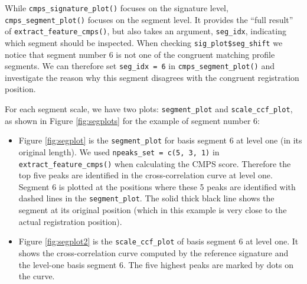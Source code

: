 While \texttt{cmps\_signature\_plot()} focuses on the signature level,
\texttt{cmps\_segment\_plot()} focuses on the segment level. It provides
the ``full result'' of \texttt{extract\_feature\_cmps()}, but also takes
an argument, \texttt{seg\_idx}, indicating which segment should be
inspected. When checking \texttt{sig\_plot\$seg\_shift} we notice that
segment number 6 is not one of the congruent matching profile segments.
We can therefore set \texttt{seg\_idx\ =\ 6} in
\texttt{cmps\_segment\_plot()} and investigate the reason why this
segment disagrees with the congruent registration position.

For each segment scale, we have two plots: \texttt{segment\_plot} and
\texttt{scale\_ccf\_plot}, as shown in Figure \ref{fig:segplots} for the
example of segment number 6:

\begin{itemize}
\item
  Figure \ref{fig:segplot} is the \texttt{segment\_plot} for basis
  segment 6 at level one (in its original length). We used
  \texttt{npeaks\_set\ =\ c(5,\ 3,\ 1)} in
  \texttt{extract\_feature\_cmps()} when calculating the CMPS score.
  Therefore the top five peaks are identified in the cross-correlation
  curve at level one. Segment 6 is plotted at the positions where these
  5 peaks are identified with dashed lines in the
  \texttt{segment\_plot}. The solid thick black line shows the segment
  at its original position (which in this example is very close to the
  actual registration position).
\item
  Figure \ref{fig:segplot2} is the \texttt{scale\_ccf\_plot} of basis
  segment 6 at level one. It shows the cross-correlation curve computed
  by the reference signature and the level-one basis segment 6. The five
  highest peaks are marked by dots on the curve.
\end{itemize}

